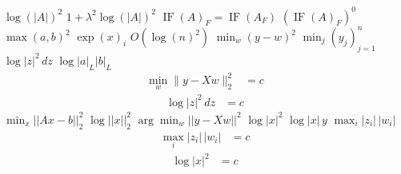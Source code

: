 \documentclass{article}
\begin{document}
$\log(|A|)^{2}$ $1+\lambda^{2}\log(|A|)^{2}$ $\operatorname{IF}(A)_{F}=\operatorname{IF}(A_{F})$ $(\operatorname{IF}(A)_{F})^{0}$
$\max(a,b)^{2}$ $\exp(x)_{i}$ $O(\log(n)^{2})$
$\min_{w}(y-w)^{2}$ $\min_{j}(y_{j})_{j=1}^{n}$
$\log|z|^{2}\,dz$ $\log|a|_{L}|b|_{L}$
\[\begin{split}\min_{w}\|y-Xw\|_{2}^{2}&=c\end{split}\]
\[\begin{split}\log|z|^{2}\,dz&=c\end{split}\]
$\min_{x}||Ax-b||_{2}^{2}$ $\log||x||_{2}^{2}$ $\arg\min_{w}||y-Xw||^{2}$ $\log\lvert x\rvert^{2}$ $\log\lvert x\rvert\,y$ $\max_{i}|z_{i}|\,|w_{i}|$
\[\begin{split}\max_{i}|z_{i}|\,|w_{i}|&=c\end{split}\]
\[\begin{split}\log\lvert x\rvert^{2}&=c\end{split}\]
\end{document}
